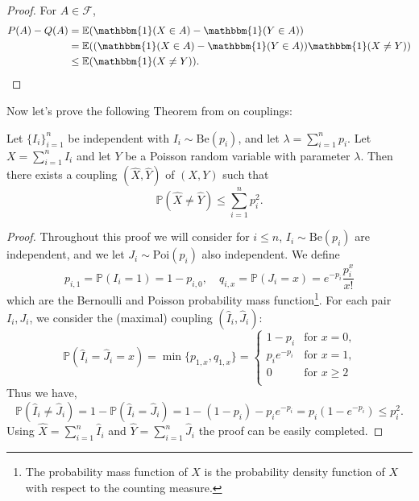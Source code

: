 \begin{proof}
	For $A \in \mathcal{F}$, 
	\begin{align}
		P(A) - Q(A) &= \mathbb{E}(\mathbbm{1}(X\in A)- \mathbbm{1}(Y\in A)) \\
				   &= \mathbb{E}((\mathbbm{1}(X\in A)- \mathbbm{1}(Y\in A))\mathbbm{1}(X \neq Y))\\ 
		     &\leq \mathbb{E}(\mathbbm{1}(X \neq Y)).
	\end{align}
\end{proof}
Now let's prove the following Theorem from \cite{Hofstad16} on couplings:
\begin{theorem}
	Let $\{I_i\}_{i=1}^n$ be independent with $I_i \sim \text{Be}(p_i)$, and let $\lambda = \sum_{i=1}^n p_i$.
	Let $X = \sum_{i=1}^n I_i$ and let $Y$ be a Poisson random variable with parameter $\lambda$.
	Then there exists a coupling $(\hat{X}, \hat{Y})$ of $(X, Y)$ such that
	\begin{equation}
		\mathbb{P}(\hat{X} \neq \hat{Y}) \leq \sum_{i=1}^n p_i^2.
	\end{equation}
\end{theorem}
\begin{proof}
	Throughout this proof we will consider for $i\leq n$,  $I_i \sim \text{Be}(p_i)$ are independent, and we let $J_i \sim \text{Poi}(p_i)$ also independent.
	We define
	\begin{equation}
		p_{i,1} = \mathbb{P}(I_i = 1) = 1-p_{i,0}, \quad q_{i,x} = \mathbb{P}(J_i = x) = e^{-p_i}\frac{p_i^x}{x!}
	\end{equation}
	which are the Bernoulli and Poisson probability mass function\footnote{The probability mass function of $X$ is the probability density function of $X$ with respect to the counting measure.}.
	\newline
	For each pair $I_i, J_i$, we consider the (maximal) coupling $(\hat{I}_i, \hat{J}_i)$:
	\begin{equation}
		\mathbb{P}(\hat{I}_i = \hat{J}_i =x) = \min\{p_{1,x}, q_{1, x}\} = \left\{	\begin{array}{rl}
												1-p_i  &\text{for $x = 0$,}\\
												p_ie^{-p_i} &\text{for $x= 1$,}\\
												0 &\text{for $x\geq 2$}\\
											\end{array}
										\right.
	\end{equation}
	Thus we have,
	\begin{equation}
		\mathbb{P}(\hat{I}_i \neq \hat{J}_i) = 1 - \mathbb{P}(\hat{I}_i = \hat{J}_i) = 1 - (1-p_i) - p_ie^{-p_i} = p_i(1-e^{-p_i}) \leq p_i^2.
	\end{equation}
	Using $\hat{X} = \sum_{i=1}^n \hat{I}_i$ and $\hat{Y} = \sum_{i=1}^n \hat{J}_i$ the proof can be easily completed.
\end{proof}
